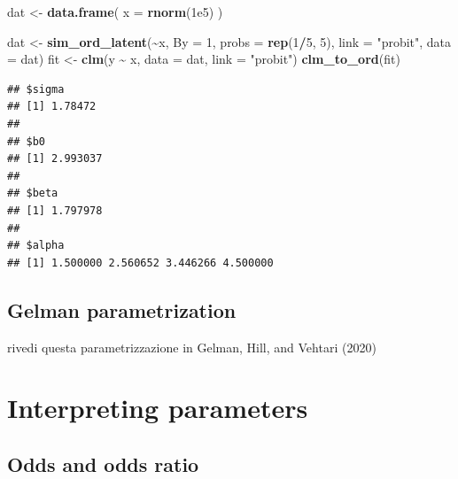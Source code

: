 \documentclass[
  man,floatsintext]{apa6}
\newenvironment{Shaded}{\begin{snugshade}}{\end{snugshade}}
\newcommand{\AttributeTok}[1]{\textcolor[rgb]{0.13,0.29,0.53}{#1}}
\newcommand{\DecValTok}[1]{\textcolor[rgb]{0.00,0.00,0.81}{#1}}
\newcommand{\FloatTok}[1]{\textcolor[rgb]{0.00,0.00,0.81}{#1}}
\newcommand{\FunctionTok}[1]{\textcolor[rgb]{0.13,0.29,0.53}{\textbf{#1}}}
\newcommand{\NormalTok}[1]{#1}
\newcommand{\OtherTok}[1]{\textcolor[rgb]{0.56,0.35,0.01}{#1}}
\newcommand{\SpecialCharTok}[1]{\textcolor[rgb]{0.81,0.36,0.00}{\textbf{#1}}}
\newcommand{\StringTok}[1]{\textcolor[rgb]{0.31,0.60,0.02}{#1}}
\begin{document}
\normalsize

\scriptsize

\begin{Shaded}
\begin{Highlighting}[]
\NormalTok{dat }\OtherTok{\textless{}{-}} \FunctionTok{data.frame}\NormalTok{(}
  \AttributeTok{x =} \FunctionTok{rnorm}\NormalTok{(}\FloatTok{1e5}\NormalTok{)}
\NormalTok{)}

\NormalTok{dat }\OtherTok{\textless{}{-}} \FunctionTok{sim\_ord\_latent}\NormalTok{(}\SpecialCharTok{\textasciitilde{}}\NormalTok{x, }\AttributeTok{By =} \DecValTok{1}\NormalTok{, }\AttributeTok{probs =} \FunctionTok{rep}\NormalTok{(}\DecValTok{1}\SpecialCharTok{/}\DecValTok{5}\NormalTok{, }\DecValTok{5}\NormalTok{), }\AttributeTok{link =} \StringTok{"probit"}\NormalTok{, }\AttributeTok{data =}\NormalTok{ dat)}
\NormalTok{fit }\OtherTok{\textless{}{-}} \FunctionTok{clm}\NormalTok{(y }\SpecialCharTok{\textasciitilde{}}\NormalTok{ x, }\AttributeTok{data =}\NormalTok{ dat, }\AttributeTok{link =} \StringTok{"probit"}\NormalTok{)}
\FunctionTok{clm\_to\_ord}\NormalTok{(fit)}
\end{Highlighting}
\end{Shaded}

\begin{verbatim}
## $sigma
## [1] 1.78472
## 
## $b0
## [1] 2.993037
## 
## $beta
## [1] 1.797978
## 
## $alpha
## [1] 1.500000 2.560652 3.446266 4.500000
\end{verbatim}

\normalsize

\subsection{Gelman parametrization}\label{gelman-parametrization}

rivedi questa parametrizzazione in Gelman, Hill, and Vehtari (2020)

\scriptsize

\normalsize

\section{Interpreting parameters}\label{interpreting-parameters}

\subsection{Odds and odds ratio}\label{odds-and-odds-ratio}
\end{document}
